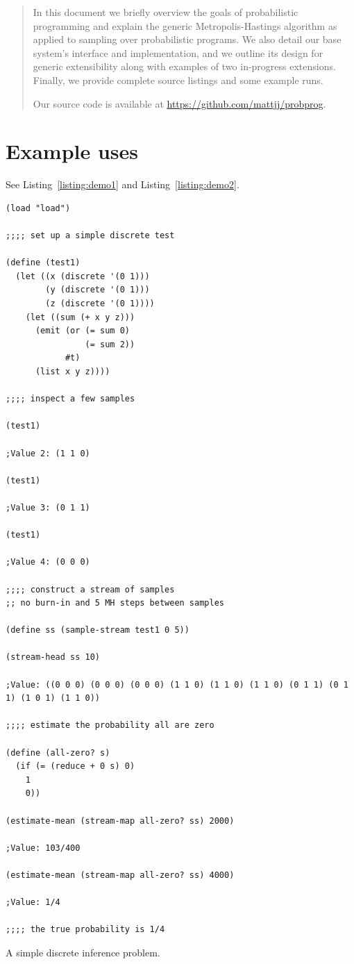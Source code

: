 \documentclass{article}
\begin{document}
\begin{abstract}
        In this document we briefly overview the goals of probabilistic
        programming and explain the generic Metropolis-Hastings algorithm as
        applied to sampling over probabilistic programs. We also detail our
        base system's interface and implementation, and we outline its design
        for generic extensibility along with examples of two in-progress
        extensions. Finally, we provide complete source listings and some
        example runs.

        Our source code is available at \url{https://github.com/mattjj/probprog}.
    \end{abstract}

\section{Example uses}
See Listing~\ref{listing:demo1} and Listing~\ref{listing:demo2}.

\begin{listing}[hp]
\begin{verbatim}
(load "load")

;;;; set up a simple discrete test

(define (test1)
  (let ((x (discrete '(0 1)))
        (y (discrete '(0 1)))
        (z (discrete '(0 1))))
    (let ((sum (+ x y z)))
      (emit (or (= sum 0)
                (= sum 2))
            #t)
      (list x y z))))

;;;; inspect a few samples

(test1)

;Value 2: (1 1 0)

(test1)

;Value 3: (0 1 1)

(test1)

;Value 4: (0 0 0)

;;;; construct a stream of samples
;; no burn-in and 5 MH steps between samples

(define ss (sample-stream test1 0 5))

(stream-head ss 10)

;Value: ((0 0 0) (0 0 0) (0 0 0) (1 1 0) (1 1 0) (1 1 0) (0 1 1) (0 1 1) (1 0 1) (1 1 0))

;;;; estimate the probability all are zero

(define (all-zero? s)
  (if (= (reduce + 0 s) 0)
    1
    0))

(estimate-mean (stream-map all-zero? ss) 2000)

;Value: 103/400

(estimate-mean (stream-map all-zero? ss) 4000)

;Value: 1/4

;;;; the true probability is 1/4
\end{verbatim}
\caption{A simple discrete inference problem.}
\label{listing:demo1}
\end{listing}
\end{document}
